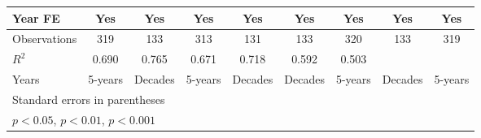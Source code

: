 \begin{table}[htbp]
\begin{tabular}{l*{8}{c}}
\addlinespace
Year FE         &      Yes         &      Yes         &      Yes         &      Yes         &      Yes         &      Yes         &      Yes         &      Yes         \\
\midrule
Observations    &      319         &      133         &      313         &      131         &      133         &      320         &      133         &      319         \\
\(R^{2}\)       &    0.690         &    0.765         &    0.671         &    0.718         &    0.592         &    0.503         &                  &                  \\
Years           &  5-years         &  Decades         &  5-years         &  Decades         &  Decades         &  5-years         &  Decades         &  5-years         \\
\bottomrule
\multicolumn{9}{l}{\footnotesize Standard errors in parentheses}\\
\multicolumn{9}{l}{\footnotesize \sym{*} \(p<0.05\), \sym{**} \(p<0.01\), \sym{***} \(p<0.001\)}\\
\end{tabular}
\end{table}
